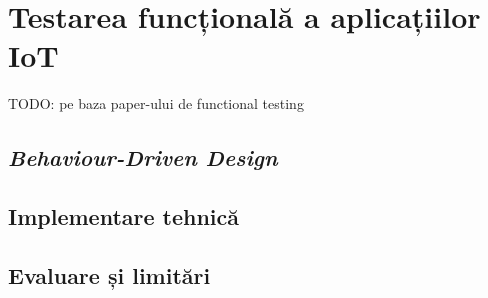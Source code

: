 \chapter{Testarea funcțională a aplicațiilor IoT}

TODO: pe baza paper-ului de functional testing

\section{\emph{Behaviour-Driven Design}}

\section{Implementare tehnică}

\section{Evaluare și limitări}